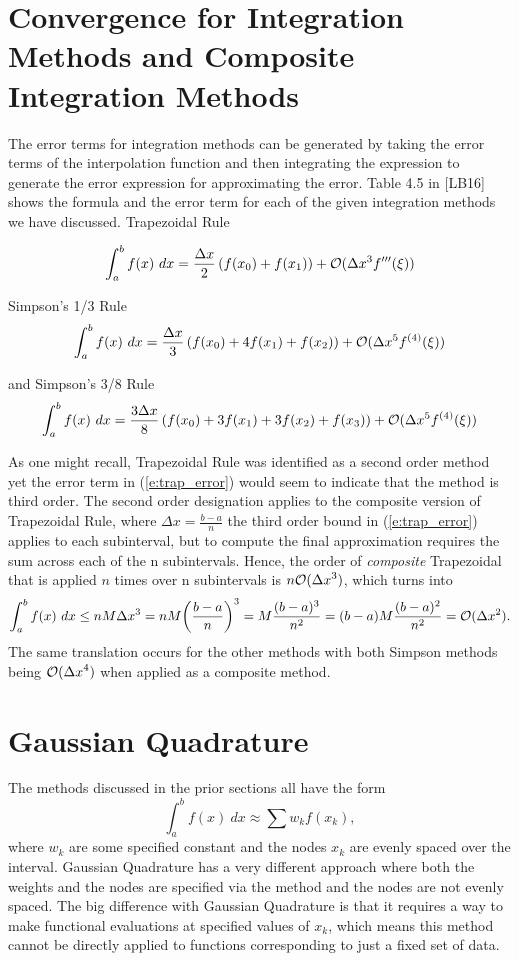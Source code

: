 \documentclass[twoside]{article}
\renewcommand{\cite}[1]{[#1]}
\def\ds{\displaystyle}
\begin{document}
\section{Convergence for Integration Methods and Composite Integration Methods}
The error terms for integration methods can be generated by taking the error terms of the interpolation function and then integrating the expression to generate the error expression for approximating the error. Table 4.5 in \cite{LB16} shows the formula and the error term for each of the given integration methods we have discussed. Trapezoidal Rule 

\begin{equation}
\int_a^b f(x) \ dx = \frac {\Delta x}2 \left( f(x_0) + f(x_1) \right) + {\cal O}(\Delta x^3 f'''(\xi))
\label{e:trap_error}
\end{equation}

Simpson's 1/3 Rule
$$\int_a^b f(x) \ dx = \frac {\Delta x}3 \left( f(x_0) + 4 f(x_1) + f(x_2) \right) + {\cal O}(\Delta x^5 f^{(4)}(\xi))$$

and Simpson's 3/8 Rule
$$\int_a^b f(x) \ dx = \frac {3\Delta x}8 \left( f(x_0) + 3 f(x_1) + 3 f(x_2) +f(x_3) \right) + {\cal O}(\Delta x^5 f^{(4)}(\xi))$$

As one might recall, Trapezoidal Rule was identified as a second order method yet the error term in (\ref{e:trap_error}) would seem to indicate that the method is third order. The second order designation applies to the composite version of Trapezoidal Rule, where $\ds \Delta x = \frac {b-a}n$ the third order bound in (\ref{e:trap_error}) applies to each subinterval, but to compute the final approximation requires the sum across each of the n subintervals. Hence, the order of {\it composite} Trapezoidal that is applied $n$ times over n subintervals is $\ds n {\cal O}(\Delta x^3)$, which turns into 
$$\int_a^b f(x) \ dx \le n M\Delta x^3 = n M \biggr (\frac {b-a}n\biggr )^3 =  M \frac {(b-a)^3}{n^2} = (b-a)M \frac {(b-a)^2}{n^2} = {\cal O}(\Delta x^2).$$ 
The same translation occurs for the other methods with both Simpson methods being $\ds {\cal O}(\Delta x^4)$ when applied as a composite method. 

\section{Gaussian Quadrature}
The methods discussed in the prior sections all have the form
$$\int_a^b f(x) \ dx \approx \sum w_k f(x_k),$$
where $\ds w_k$ are some specified constant and the nodes $\ds x_k$ are evenly spaced over the interval. Gaussian Quadrature has a very different approach where both the weights and the nodes are specified via the method and the nodes are not evenly spaced. The big difference with Gaussian Quadrature is that it requires a way to make functional evaluations at specified values of $\ds x_k$, which means this method cannot be directly applied to functions corresponding to just a fixed set of data. 
\end{document}
